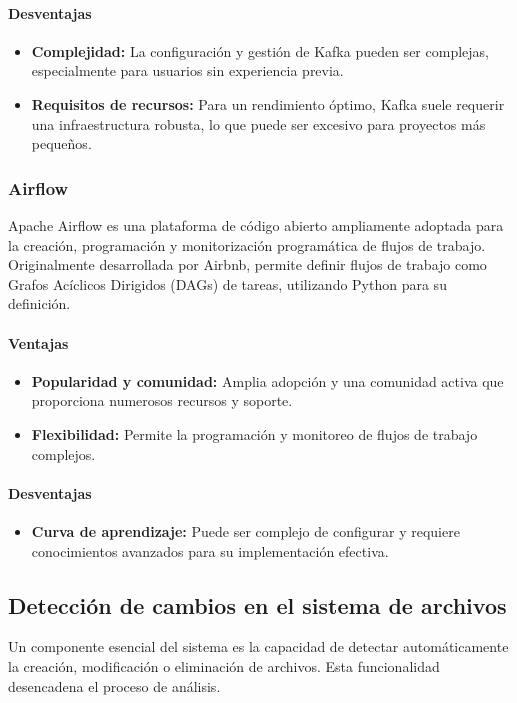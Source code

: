 \paragraph{Desventajas}
\begin{itemize}
    \item \textbf{Complejidad:} La configuración y gestión de Kafka pueden ser complejas, especialmente para usuarios sin experiencia previa.
    \item \textbf{Requisitos de recursos:} Para un rendimiento óptimo, Kafka suele requerir una infraestructura robusta, lo que puede ser excesivo para proyectos más pequeños.
\end{itemize}

\subsubsection{Airflow}
Apache Airflow es una plataforma de código abierto ampliamente adoptada para la creación, programación y monitorización programática de flujos de trabajo. Originalmente desarrollada por Airbnb, permite definir flujos de trabajo como Grafos Acíclicos Dirigidos (DAGs) de tareas, utilizando Python para su definición.

\paragraph{Ventajas}
\begin{itemize}
    \item \textbf{Popularidad y comunidad:} Amplia adopción y una comunidad activa que proporciona numerosos recursos y soporte.
    \item \textbf{Flexibilidad:} Permite la programación y monitoreo de flujos de trabajo complejos.
\end{itemize}

\paragraph{Desventajas}
\begin{itemize}
    \item \textbf{Curva de aprendizaje:} Puede ser complejo de configurar y requiere conocimientos avanzados para su implementación efectiva.
\end{itemize}

\subsection{Detección de cambios en el sistema de archivos}
Un componente esencial del sistema es la capacidad de detectar automáticamente la creación, modificación o eliminación de archivos. Esta funcionalidad desencadena el proceso de análisis.

